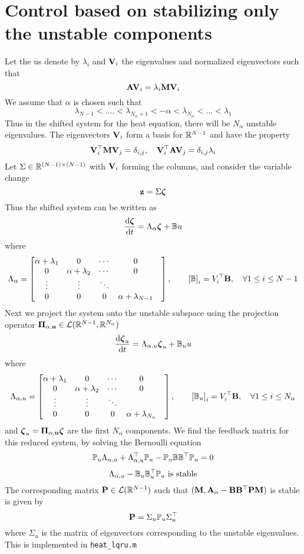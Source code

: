 \documentclass[12pt]{article}
\begin{document}

\section{Control based on stabilizing only the unstable components}
Let the us denote by $\lambda_i$ and ${\mathbf V}_i$ the eigenvalues and normalized eigenvectors such that
\[
 {\mathbf A} {\mathbf V}_i = \lambda_i {\mathbf M} {\mathbf V}_i
\]
We assume that $\alpha$ is chosen such that
\[
 \lambda_{N-1} < .... <\lambda_{N_\alpha +1} < -\alpha < \lambda_{N_\alpha} < ... < \lambda_1
\]
Thus in the shifted system for the heat equation, there will be $N_\alpha$ unstable eigenvalues.
The eigenvectors ${\mathbf V}_i$ form a basis for $\mathbb{R}^{N-1}$ and have the property
\[
 {\mathbf V}_i^\top {\mathbf M} {\mathbf V}_j = \delta_{i,j}, \quad {\mathbf V}_i^\top {\mathbf A} {\mathbf V}_j = \delta_{i,j} \lambda_i
\]
Let $\Sigma \in \mathbb{R}^{(N-1) \times (N-1)}$ with ${\mathbf V}_i$ forming the columns, and consider the variable change
\[
 {\mathbf z} = \Sigma \boldsymbol{\zeta}
\]
Thus the shifted system can be written as
\[
 \frac{\textrm{d} \boldsymbol{\zeta}}{\textrm{d} t} = \Lambda_\alpha \boldsymbol{\zeta} + \mathbb{B} u
\]
where
\[
 \Lambda_\alpha = \begin{bmatrix}
                   \alpha + \lambda_1 & 0 & \cdots & 0\\
                   0 & \alpha + \lambda_2 & \cdots & 0\\
                   \vdots & \vdots & \ddots & &\\
                   0 & 0 & 0 & \alpha + \lambda_{N-1}
                  \end{bmatrix}, \qquad
 \left[\mathbb{B}\right]_i = V^\top_i {\mathbf B}, \quad \forall 1 \le i \le N-1                                   
\]
Next we project the system onto the unstable subspace using the projection operator $\mathbf{\Pi_{\alpha,u}} \in \mathcal{L}(\mathbb{R}^{N-1},\mathbb{R}^{N_\alpha})$
\[
 \frac{\textrm{d} \boldsymbol{\zeta}_u}{\textrm{d} t} = \Lambda_{\alpha,u} \boldsymbol{\zeta}_u + \mathbb{B}_u u
\]
where
\[
 \Lambda_{\alpha,u} = \begin{bmatrix}
                   \alpha + \lambda_1 & 0 & \cdots & 0\\
                   0 & \alpha + \lambda_2 & \cdots & 0\\
                   \vdots & \vdots & \ddots & &\\
                   0 & 0 & 0 & \alpha + \lambda_{N_\alpha}
                  \end{bmatrix}, \qquad
 \left[\mathbb{B}_u \right]_i = V^\top_i {\mathbf B}, \quad \forall 1 \le i \le N_\alpha                                   
\]
and $\boldsymbol{\zeta}_u = \mathbf{\Pi_{\alpha,u}} \boldsymbol{\zeta}$ are the first $N_\alpha$ components. We find the feedback matrix for this reduced system, by solving the Bernoulli equation
\[
 \mathbb{P}_u \Lambda_{\alpha,u} + \Lambda^\top_{\alpha,u} \mathbb{P}_u - \mathbb{P}_u \mathbb{B} \mathbb{B}^\top \mathbb{P}_u = 0
\]
\[
 \Lambda_{\alpha,u} - \mathbb{B}_u \mathbb{B}_u^\top \mathbb{P}_u \text{ is stable}
\]
The corresponding matrix ${\mathbf P} \in \mathcal{L}(\mathbb{R}^{N-1})$ such that $({\mathbf M},{\mathbf A}_\alpha - {\mathbf B}{\mathbf B}^\top{\mathbf P}{\mathbf M})$ is stable is given by
\[
 {\mathbf P} = \Sigma_u \mathbb{P}_u \Sigma^\top_u
\]
where $\Sigma_u$ is the matrix of eigenvectors corresponding to the unstable eigenvalues. This is implemented in {\tt heat\_lqru.m}
\end{document}
